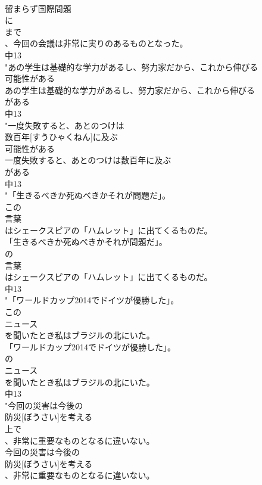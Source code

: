 \documentclass[8pt]{extreport}
\begin{document}
\begin{CJK}{UTF8}{min}
\\	留まらず国際問題
\\	に
\\	まで
\\	、今回の会議は非常に実りのあるものとなった。
\\	中13
\\	"あの学生は基礎的な学力があるし、努力家だから、これから伸びる
\\	可能性がある
\\	あの学生は基礎的な学力があるし、努力家だから、これから伸びる
\\	がある
\\	中13
\\	"一度失敗すると、あとのつけは
\\	数百年[すうひゃくねん]に及ぶ
\\	可能性がある
\\	一度失敗すると、あとのつけは数百年に及ぶ
\\	がある
\\	中13
\\	"「生きるべきか死ぬべきかそれが問題だ」。
\\	この
\\	言葉
\\	はシェークスピアの「ハムレット」に出てくるものだ。
\\	「生きるべきか死ぬべきかそれが問題だ」。
\\	の
\\	言葉
\\	はシェークスピアの「ハムレット」に出てくるものだ。
\\	中13
\\	"「ワールドカップ2014でドイツが優勝した」。
\\	この
\\	ニュース
\\	を聞いたとき私はブラジルの北にいた。
\\	「ワールドカップ2014でドイツが優勝した」。
\\	の
\\	ニュース
\\	を聞いたとき私はブラジルの北にいた。
\\	中13
\\	"今回の災害は今後の
\\	防災[ぼうさい]を考える
\\	上で
\\	、非常に重要なものとなるに違いない。
\\	今回の災害は今後の
\\	防災[ぼうさい]を考える
\\	、非常に重要なものとなるに違いない。

\end{CJK}
\end{document}
